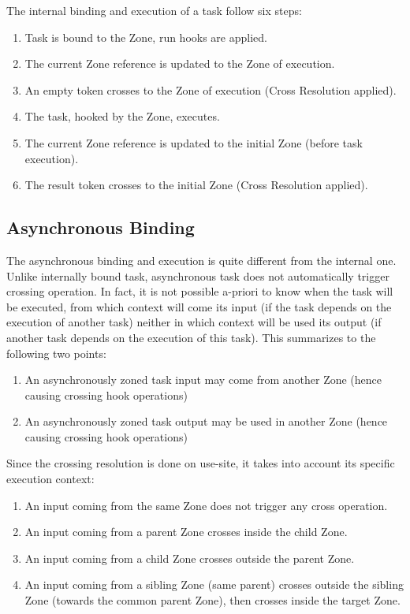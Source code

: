 The internal binding and execution of a task follow six steps:
\begin{enumerate}
\item Task is bound to the Zone, run hooks are applied.
\item The current Zone reference is updated to the Zone of execution.
\item An empty token crosses to the Zone of execution (Cross Resolution applied).
\item The task, hooked by the Zone, executes.
\item The current Zone reference is updated to the initial Zone (before task execution).
\item The result token crosses to the initial Zone (Cross Resolution applied).
\end{enumerate}

\subsection*{Asynchronous Binding}

The asynchronous binding and execution is quite different from the internal one. Unlike internally bound task, asynchronous task does not automatically trigger crossing operation. In fact, it is not possible a-priori to know when the task will be executed, from which context will come its input (if the task depends on the execution of another task) neither in which context will be used its output (if another task depends on the execution of this task). This summarizes to the following two points:
\begin{enumerate}
\item An asynchronously zoned task input may come from another Zone (hence causing crossing hook operations)
\item An asynchronously zoned task output may be used in another Zone (hence causing crossing hook operations)
\end{enumerate}

Since the crossing resolution is done on use-site, it takes into account its specific execution context:
\begin{enumerate}
\item An input coming from the same Zone does not trigger any cross operation.
\item An input coming from a parent Zone crosses inside the child Zone.
\item An input coming from a child Zone crosses outside the parent Zone.
\item An input coming from a sibling Zone (same parent) crosses outside the sibling Zone (towards the common parent Zone), then crosses inside the target Zone.
\end{enumerate}

